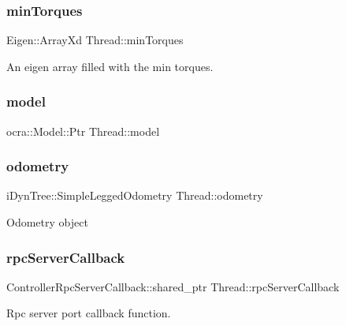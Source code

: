 \hypertarget{classThread_a414015415c64371877d6028417c4f9e2}{}\label{classThread_a414015415c64371877d6028417c4f9e2} 
\subsubsection{\texorpdfstring{min\+Torques}{minTorques}}
{\footnotesize\ttfamily Eigen\+::\+Array\+Xd Thread\+::min\+Torques\hspace{0.3cm}{\ttfamily [private]}}

An eigen array filled with the min torques. \hypertarget{classThread_a1dcef9aedc1a707e6f04d5fb6e4a0b13}{}\label{classThread_a1dcef9aedc1a707e6f04d5fb6e4a0b13} 
\subsubsection{\texorpdfstring{model}{model}}
{\footnotesize\ttfamily ocra\+::\+Model\+::\+Ptr Thread\+::model\hspace{0.3cm}{\ttfamily [private]}}

\hypertarget{classThread_a23a41c6ccd1df898084112cfd46120f3}{}\label{classThread_a23a41c6ccd1df898084112cfd46120f3} 
\subsubsection{\texorpdfstring{odometry}{odometry}}
{\footnotesize\ttfamily i\+Dyn\+Tree\+::\+Simple\+Legged\+Odometry Thread\+::odometry\hspace{0.3cm}{\ttfamily [private]}}

Odometry object \hypertarget{classThread_a602de8d12886c9c57b5420c83804a38b}{}\label{classThread_a602de8d12886c9c57b5420c83804a38b} 
\subsubsection{\texorpdfstring{rpc\+Server\+Callback}{rpcServerCallback}}
{\footnotesize\ttfamily Controller\+Rpc\+Server\+Callback\+::shared\+\_\+ptr Thread\+::rpc\+Server\+Callback\hspace{0.3cm}{\ttfamily [private]}}

Rpc server port callback function. \hypertarget{classThread_adbec1b4f2c8fc40641df6f118e93fd25}{}\label{classThread_adbec1b4f2c8fc40641df6f118e93fd25} 
